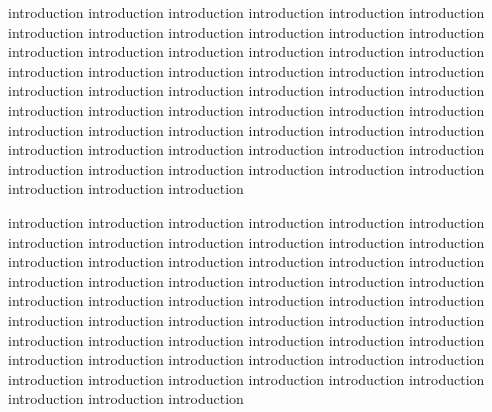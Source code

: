 introduction introduction introduction introduction introduction introduction introduction introduction introduction introduction introduction introduction introduction introduction introduction introduction introduction introduction introduction introduction introduction introduction introduction introduction introduction introduction introduction introduction introduction introduction introduction introduction introduction introduction introduction introduction introduction introduction introduction introduction introduction introduction introduction introduction introduction introduction introduction introduction introduction introduction introduction introduction introduction introduction introduction introduction introduction

introduction introduction introduction introduction introduction introduction introduction introduction introduction introduction introduction introduction introduction introduction introduction introduction introduction introduction introduction introduction introduction introduction introduction introduction introduction introduction introduction introduction introduction introduction introduction introduction introduction introduction introduction introduction introduction introduction introduction introduction introduction introduction introduction introduction introduction introduction introduction introduction introduction introduction introduction introduction introduction introduction introduction introduction introduction

